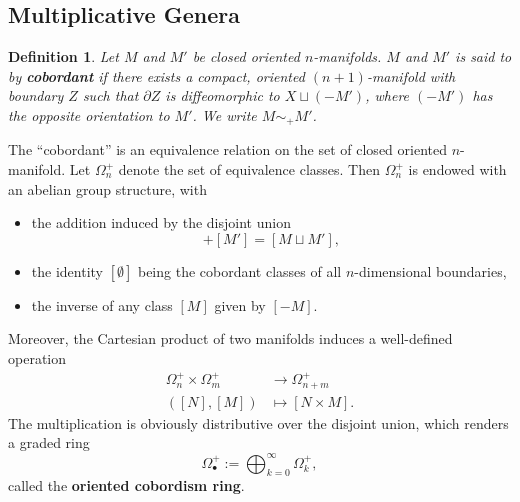 \documentclass[11pt]{article}
\newtheorem{dfn}[thm]{Definition}
\begin{document}
\subsection{Multiplicative Genera}
\begin{dfn}
	Let $M$ and $M'$ be closed oriented $n$-manifolds. $M$ and $M'$ is said to by \textbf{cobordant} if there exists a compact, oriented $(n+1)$-manifold with boundary $Z$ such that $\partial Z$ is diffeomorphic to $X\sqcup (-M')$, where $(-M')$ has the opposite orientation to $M'$. We write $M\sim_+ M'$. 
\end{dfn}
 The ``cobordant'' is an equivalence relation on the set of closed oriented $n$-manifold. Let $\Omega^{+}_n$ denote the set of equivalence classes. Then $\Omega^+_n$ is endowed with an abelian group structure, with
 \begin{itemize}
 	\item the addition induced by the disjoint union
 	\begin{equation*}
 		[M]+[M']=[M\sqcup M'],
 	\end{equation*}
 	\item the identity $[\emptyset]$ being the cobordant classes of all $n$-dimensional boundaries,
 	\item the inverse of any class $[M]$ given by $[-M]$.
 \end{itemize}
 Moreover, the Cartesian product of two manifolds induces a well-defined operation
 \begin{equation*}
 \begin{aligned}
 	\Omega^+_n\times \Omega^+_m & \longrightarrow \Omega^+_{n+m}\\
 	([N],[M]) & \longmapsto[N\times M].
 \end{aligned}
 \end{equation*}
 The multiplication is obviously distributive over the disjoint union, which renders a graded ring 
 \begin{equation*}
 	\Omega^+_\bullet:=\bigoplus^\infty_{k=0}\Omega_k^+,
 \end{equation*}
 called the \textbf{oriented cobordism ring}.
\end{document}

